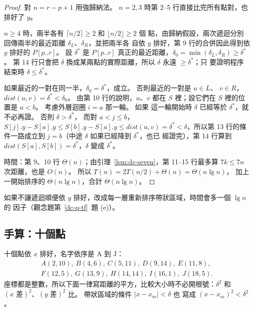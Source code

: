 \begin{proof}
對 $n = r - p + 1$ 用強歸納法。 $n = 2, 3$ 時第 2--5 行直接比完所有點對，也排好了
$y$。

$n \ge 4$ 時，兩半各有 $\lceil n/2 \rceil \ge 2$ 和 $\lfloor n/2 \rfloor \ge 2$ 個
點，由歸納假設，兩次遞迴分別回傳兩半的最近距離 $\delta_L$、$\delta_R$，並把兩半各
自依 $y$ 排好，第 9 行的合併因此得到依 $y$ 排好的 $P[p..r]$。 設 $\delta^*$ 是
$P[p..r]$ 真正的最近距離，$\delta_0 = \min(\delta_L, \delta_R) \ge \delta^*$。 第
14 行只會把 $\delta$ 換成某兩點的實際距離，所以 $\delta$ 永遠 $\ge \delta^*$；只
要證明程序結束時 $\delta \le \delta^*$。

如果最近的一對在同一半，$\delta_0 = \delta^*$，成立。 否則最近的一對是 $u \in L$、
$v \in R$，$\mathit{dist}(u, v) = \delta^* < \delta_0$。 由第 10 行的說明，$u$、$v$
都在 $S$ 裡；設它們在 $S$ 裡的位置是 $a < b$。 考慮外層迴圈 $i = a$ 那一輪。 如果
這一輪開始時 $\delta$ 已經等於 $\delta^*$，就不必再證。 否則 $\delta > \delta^*$，
而對 $a < j \le b$，$S[j].y - S[a].y \le S[b].y - S[a].y \le \mathit{dist}(u, v) =
\delta^* < \delta$，所以第 13 行的條件一路成立到 $j = b$（中途 $\delta$ 如果已經降到 $\delta^*$，也已
經證完），第 14 行算到 $\mathit{dist}(S[a], S[b]) = \delta^*$，$\delta$ 變成
$\delta^*$。

時間：第 9、10 行 $\Theta(n)$；由引理~\ref{lem:dc-seven}，第 11--15 行最多算
$7k \le 7n$ 次距離，也是 $O(n)$。 所以 $T(n) = 2T(n/2) + \Theta(n) = \Theta(n \lg n)$，
加上一開始排序的 $\Theta(n \lg n)$，合計 $\Theta(n \lg n)$。
\end{proof}

如果不讓遞迴順便依 $y$ 排好，改成每一層重新排序帶狀區域，時間會多一個 $\lg n$ 的
因子（觀念題第~\ref{dc-q-tf}~題 (e)）。

\subsection{手算：十個點}

十個點依 $x$ 排好，名字依序是 A 到 J：
\[
\begin{gathered}
A(2, 10),\ B(4, 6),\ C(5, 11),\ D(9, 14),\ E(11, 8), \\
F(12, 5),\ G(13, 9),\ H(14, 14),\ I(16, 1),\ J(18, 5).
\end{gathered}
\]
座標都是整數，所以下面一律寫距離的平方，比較大小時不必開根號：$\delta^2$ 和
$(x \text{ 差})^2$、$(y \text{ 差})^2$ 比。 帶狀區域的條件 $|x - x_m| < \delta$ 也
寫成 $(x - x_m)^2 < \delta^2$。

